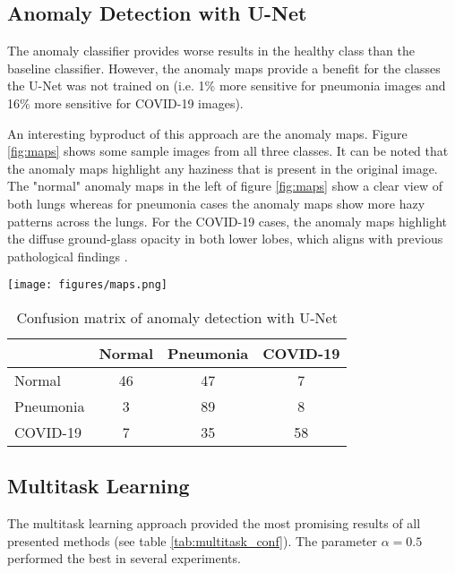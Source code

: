 \documentclass[conference]{IEEEtran}
\begin{document}
\subsection{Anomaly Detection with U-Net}

The anomaly classifier provides worse results in the healthy class than the baseline classifier. However, the anomaly maps provide a benefit for the classes the U-Net was not trained on (i.e. 1\% more sensitive for pneumonia images and 16\% more sensitive for COVID-19 images). 

An interesting byproduct of this approach are the anomaly maps. Figure \ref{fig:maps} shows some sample images from all three classes. It can be noted that the anomaly maps highlight any haziness that is present in the original image. The "normal" anomaly maps in the left of figure \ref{fig:maps} show a clear view of both lungs whereas for pneumonia cases the anomaly maps show more hazy patterns across the lungs. For the COVID-19 cases, the anomaly maps highlight the diffuse ground-glass opacity in both lower lobes, which aligns with previous pathological findings \cite{cozzi2020chest}.

\begin{figure*}
	\centering
	\texttt{[image: figures/maps.png]}
	\caption{Anomaly maps generated for all three classes}
	\label{fig:maps}
\end{figure*}

\begin{table}[h]
\centering
\caption{Confusion matrix of anomaly detection with U-Net}
\begin{tabular}{|l|c|c|c|}
\hline
 & Normal & Pneumonia & COVID-19 \\ \hline
Normal & 46 & 47 & 7 \\ \hline
Pneumonia & 3 & 89 & 8 \\ \hline
COVID-19 & 7 & 35 & 58 \\ \hline
\end{tabular}
\label{tab:anomaly_conf}
\end{table}

\subsection{Multitask Learning}

The multitask learning approach provided the most promising results of all presented methods (see table \ref{tab:multitask_conf}). The parameter $\alpha=0.5$ performed the best in several experiments. 
\end{document}
